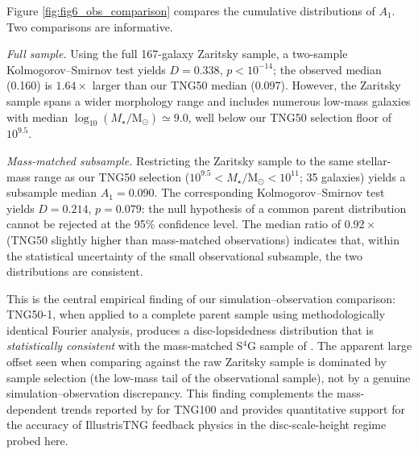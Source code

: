 \documentclass[fleqn,usenatbib]{mnras}
\newcommand{\Am}[1]{A_{#1}}
\newcommand{\Msun}{\mathrm{M}_{\odot}}
\newcommand{\Amone}{\ensuremath{\Am{1}}}
\begin{document}
Figure \ref{fig:fig6_obs_comparison} compares the cumulative
distributions of $\Amone$.  Two comparisons are informative.

\emph{Full sample.}  Using the full 167-galaxy Zaritsky sample,
a two-sample Kolmogorov--Smirnov test yields $D = 0.338$,
$p < 10^{-14}$; the observed median (0.160) is $1.64\times$
larger than our TNG50 median (0.097).  However, the Zaritsky
sample spans a wider morphology range and includes numerous
low-mass galaxies with median
$\log_{10}(M_\star / \Msun) \simeq 9.0$, well below our TNG50
selection floor of $10^{9.5}$.

\emph{Mass-matched subsample.}  Restricting the Zaritsky sample to
the same stellar-mass range as our TNG50 selection
($10^{9.5} < M_\star / \Msun < 10^{11}$; 35 galaxies) yields
a subsample median $\Amone = 0.090$.  The corresponding
Kolmogorov--Smirnov test yields $D = 0.214$, $p = 0.079$: the
null hypothesis of a common parent distribution cannot be
rejected at the 95\% confidence level.  The median ratio of
$0.92\times$ (TNG50 slightly higher than mass-matched
observations) indicates that, within the statistical
uncertainty of the small observational subsample, the two
distributions are consistent.

This is the central empirical finding of our simulation--observation
comparison: TNG50-1, when applied to a complete parent sample
using methodologically identical Fourier analysis, produces a
disc-lopsidedness distribution that is \emph{statistically
consistent} with the mass-matched S$^{4}$G sample of
\citet{2013ApJ...772..135Z}.  The apparent large offset seen when
comparing against the raw Zaritsky sample is dominated by sample
selection (the low-mass tail of the observational sample), not by
a genuine simulation--observation discrepancy.  This finding
complements the mass-dependent trends reported by
\citet{2022ApJ...940...61F} for TNG100 and provides quantitative
support for the accuracy of IllustrisTNG feedback physics in
the disc-scale-height regime probed here.
\end{document}
